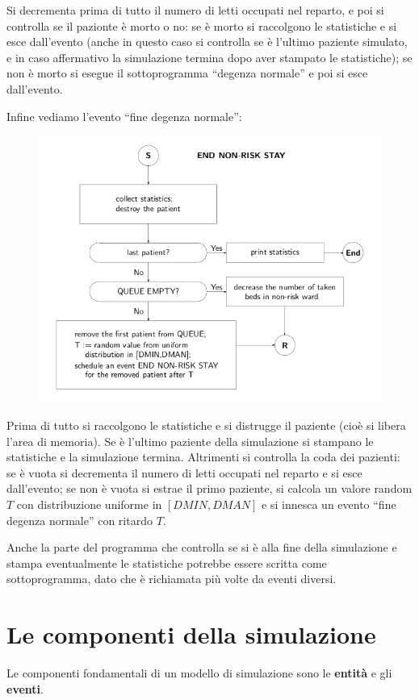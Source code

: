 \documentclass[11pt]{book}
\begin{document}
Si decrementa prima di tutto il numero di letti occupati nel reparto,
e poi si controlla se il pazionte \`e morto o no: se \`e morto si
raccolgono le statistiche e si esce dall'evento (anche in questo caso
si controlla se \`e l'ultimo paziente simulato, e in caso affermativo
la simulazione termina dopo aver stampato le statistiche); se non \`e
morto si esegue il sottoprogramma ``degenza normale'' e poi si esce
dall'evento.

Infine vediamo l'evento ``fine degenza normale'':

\begin{figure}[H]
  \centering
  \includegraphics[width=\textwidth]{images/cap11fig21.png}
\end{figure}

Prima di tutto si raccolgono le statistiche e si distrugge il paziente
(cio\`e si libera l'area di memoria). Se \`e l'ultimo paziente della
simulazione si stampano le statistiche e la simulazione
termina. Altrimenti si controlla la coda dei pazienti: se \`e vuota si
decrementa il numero di letti occupati nel reparto e si esce
dall'evento; se non \`e vuota si estrae il primo paziente, si calcola
un valore random $T$ con distribuzione uniforme in $[DMIN,DMAN]$ e si
innesca un evento ``fine degenza normale'' con ritardo $T$.

Anche la parte del programma che controlla se si \`e alla fine della
simulazione e stampa eventualmente le statistiche potrebbe essere
scritta come sottoprogramma, dato che \`e richiamata pi\`u volte da
eventi diversi.

\section{Le componenti della simulazione}
Le componenti fondamentali di un modello di simulazione sono le {\bf
  entit\`a} e gli {\bf eventi}. 
\end{document}
